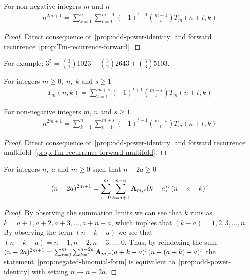 \begin{proposition}
    \label{prop:odd-power-decomposition-forward}
    For non-negative integers $m$ and $n$
    \begin{align*}
        n^{2m+1} = \sum_{k=1}^{n} \sum_{t=1}^{m+1} (-1)^{t+1} \binom{m+1}{t} T_{m} (n+t, k)
    \end{align*}
    \begin{proof}
        Direct consequence of~\eqref{prop:odd-power-identity}
        and forward recurrence~\eqref{prop:Tm-recurrence-forward}.
    \end{proof}
\end{proposition}
For example: $3^5 = \binom{3}{1} 1023 - \binom{3}{2} 2643 + \binom{3}{3} 5103$.
\begin{proposition}
    For integers $m \geq 0, \; n, \; k$ and $s \geq 1$
    \label{prop:Tm-recurrence-forward-multifold}
    \begin{align*}
        T_{m} (n,k) = \sum_{t=1}^{m+s} (-1)^{t+1} \binom{m+s}{t} T_{m} (n+t, k)
    \end{align*}
\end{proposition}

\begin{proposition}
    \label{prop:odd-power-decomposition-forward-multifold}
    For non-negative integers $m$, $n$ and $s \geq 1$
    \begin{align*}
        n^{2m+1} = \sum_{k=1}^{n} \sum_{t=1}^{m+s} (-1)^{t+1} \binom{m+s}{t} T_{m} (n+t, k)
    \end{align*}
    \begin{proof}
        Direct consequence of~\eqref{prop:odd-power-identity}
        and forward recurrence multifold~\eqref{prop:Tm-recurrence-forward-multifold}.
    \end{proof}
\end{proposition}
\begin{proposition}
    \label{prop:negated-binomial-form}
    For integers $n, \; a$ and $m\geq 0$ such that $n-2a \geq 0$
    \begin{align*}
    (n-2a)
        ^{2m+1} = \sum_{r=0}^{m} \sum_{k=a+1}^{n-a} {\mathbf{A}} \sb{m,r} (k-a)^r (n-a-k)^r
    \end{align*}
    \begin{proof}
        By observing the summation limits we can see that $k$ runs as $k=a+1,a+2,a+3,\ldots,a+n-a$, which
        implies that $(k-a)=1,2,3,\ldots, n$.
        By observing the term $(n-k-a)$ we see that $(n-k-a)=n-1,n-2,n-3,\ldots,0$.
        Thus, by reindexing the sum
        $(n-2a)^{2m+1} = \sum_{r=0}^{m} \sum_{k=1}^{n-2a} {\mathbf{A}} \sb{m,r} (a+k-a)^r (n-(a+k)-a)^r$
        the statement~\eqref{prop:negated-binomial-form} is equivalent to~\eqref{prop:odd-power-identity}
        with setting $n \rightarrow n-2a$.
    \end{proof}
\end{proposition}
